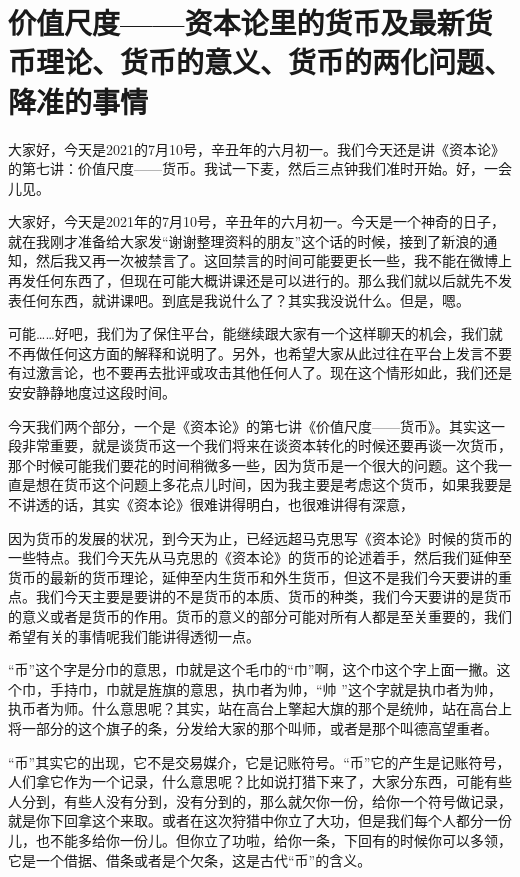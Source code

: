 \documentclass[UTF8, 12pt, a4paper]{ctexrep}
\begin{document}
\section{价值尺度——资本论里的货币及最新货币理论、货币的意义、货币的两化问题、降准的事情}

大家好，今天是2021的7月10号，辛丑年的六月初一。我们今天还是讲《资本论》的第七讲：价值尺度——货币。我试一下麦，然后三点钟我们准时开始。好，一会儿见。

大家好，今天是2021年的7月10号，辛丑年的六月初一。今天是一个神奇的日子，就在我刚才准备给大家发“谢谢整理资料的朋友”这个话的时候，接到了新浪的通知，然后我又再一次被禁言了。这回禁言的时间可能要更长一些，我不能在微博上再发任何东西了，但现在可能大概讲课还是可以进行的。那么我们就以后就先不发表任何东西，就讲课吧。到底是我说什么了？其实我没说什么。但是，嗯。

可能……好吧，我们为了保住平台，能继续跟大家有一个这样聊天的机会，我们就不再做任何这方面的解释和说明了。另外，也希望大家从此过往在平台上发言不要有过激言论，也不要再去批评或攻击其他任何人了。现在这个情形如此，我们还是安安静静地度过这段时间。

今天我们两个部分，一个是《资本论》的第七讲《价值尺度——货币》。其实这一段非常重要，就是谈货币这一个我们将来在谈资本转化的时候还要再谈一次货币，那个时候可能我们要花的时间稍微多一些，因为货币是一个很大的问题。这个我一直是想在货币这个问题上多花点儿时间，因为我主要是考虑这个货币，如果我要是不讲透的话，其实《资本论》很难讲得明白，也很难讲得有深意，

因为货币的发展的状况，到今天为止，已经远超马克思写《资本论》时候的货币的一些特点。我们今天先从马克思的《资本论》的货币的论述着手，然后我们延伸至货币的最新的货币理论，延伸至内生货币和外生货币，但这不是我们今天要讲的重点。我们今天主要是要讲的不是货币的本质、货币的种类，我们今天要讲的是货币的意义或者是货币的作用。货币的意义的部分可能对所有人都是至关重要的，我们希望有关的事情呢我们能讲得透彻一点。

“币”这个字是分巾的意思，巾就是这个毛巾的“巾”啊，这个巾这个字上面一撇。这个巾，手持巾，巾就是旌旗的意思，执巾者为帅，“帅 ”这个字就是执巾者为帅，执币者为师。什么意思呢？其实，站在高台上擎起大旗的那个是统帅，站在高台上将一部分的这个旗子的条，分发给大家的那个叫师，或者是那个叫德高望重者。

“币”其实它的出现，它不是交易媒介，它是记账符号。“币”它的产生是记账符号，人们拿它作为一个记录，什么意思呢？比如说打猎下来了，大家分东西，可能有些人分到，有些人没有分到，没有分到的，那么就欠你一份，给你一个符号做记录，就是你下回拿这个来取。或者在这次狩猎中你立了大功，但是我们每个人都分一份儿，也不能多给你一份儿。但你立了功啦，给你一条，下回有的时候你可以多领，它是一个借据、借条或者是个欠条，这是古代“币”的含义。
\end{document}
